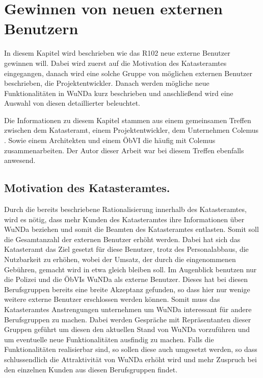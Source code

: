 \chapter{Gewinnen von neuen externen Benutzern} \label{ch:aussicht}

In diesem Kapitel wird beschrieben wie das R102 neue externe Benutzer gewinnen will. Dabei wird zuerst auf die Motivation des Katasteramtes eingegangen, danach wird eine solche Gruppe von möglichen externen Benutzer beschrieben, die Projektentwickler. Danach werden mögliche neue Funktionalitäten in \ac{WuNDa} kurz beschrieben und anschließend wird eine Auswahl von diesen detaillierter beleuchtet.

Die Informationen zu diesem Kapitel stammen aus einem gemeinsamen Treffen zwischen dem Katasteramt, einem Projektentwickler, dem Unternehmen Colemus \autocite{colemus}. Sowie einem Architekten und einem \ac{ÖbVI} die häufig mit Colemus zusammenarbeiten. Der Autor dieser Arbeit war bei diesem Treffen ebenfalls anwesend.

\section{Motivation des Katasteramtes.}

Durch die bereits beschriebene Rationalisierung innerhalb des Katasteramtes, wird es nötig, dass mehr Kunden des Katasteramtes ihre Informationen über \ac{WuNDa} beziehen und somit die Beamten des Katasteramtes entlasten.
Somit soll die Gesamtanzahl der externen Benutzer erhöht werden.
Dabei hat sich das Katasteramt das Ziel gesetzt für diese Benutzer, trotz des Personalabbaus, die Nutzbarkeit zu erhöhen, wobei der Umsatz, der durch die eingenommenen Gebühren, gemacht wird in etwa gleich bleiben soll.
Im Augenblick benutzen nur die Polizei und die \acp{ÖbVI} \ac{WuNDa} als externe Benutzer.
Dieses hat bei diesen Berufsgruppen bereits eine breite Akzeptanz gefunden, so dass hier nur wenige weitere externe Benutzer erschlossen werden können.
Somit muss das Katasteramtes Anstrengungen unternehmen um \ac{WuNDa} interessant für andere Berufsgruppen zu machen.
Dabei werden Gespräche mit Repräsentanten dieser Gruppen geführt um diesen den aktuellen Stand von \ac{WuNDa} vorzuführen und um eventuelle neue Funktionalitäten ausfindig zu machen.
Falls die Funktionalitäten realisierbar sind, so sollen diese auch umgesetzt werden, so dass schlussendlich die Attraktivität von \ac{WuNDa} erhöht wird und mehr Zuspruch bei den einzelnen Kunden aus diesen Berufsgruppen findet.

